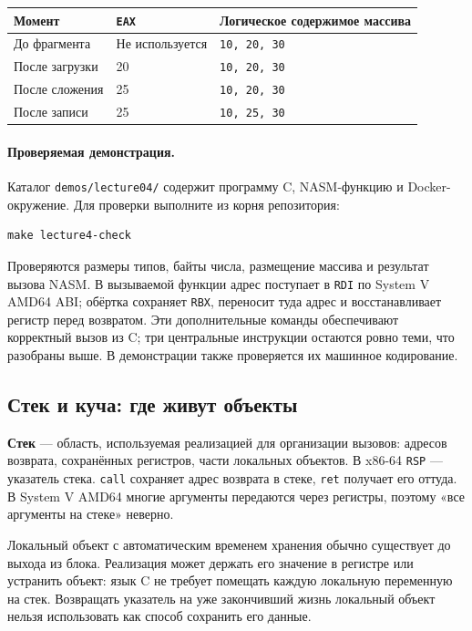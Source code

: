 \begin{center}
\small
\begin{tabular}{|l|l|l|}
\hline
Момент & \texttt{EAX} & Логическое содержимое массива \\
\hline
До фрагмента & Не используется & \texttt{10, 20, 30} \\
После загрузки & 20 & \texttt{10, 20, 30} \\
После сложения & 25 & \texttt{10, 20, 30} \\
После записи & 25 & \texttt{10, 25, 30} \\
\hline
\end{tabular}
\end{center}

\paragraph{Проверяемая демонстрация.}
Каталог \texttt{demos/lecture04/} содержит программу C, NASM-функцию
и Docker-окружение. Для проверки выполните из корня репозитория:
\begin{verbatim}
make lecture4-check
\end{verbatim}
Проверяются размеры типов, байты числа, размещение массива и результат
вызова NASM.
В вызываемой функции адрес поступает в \texttt{RDI} по System V AMD64 ABI;
обёртка сохраняет \texttt{RBX}, переносит туда адрес и восстанавливает регистр
перед возвратом. Эти дополнительные команды обеспечивают корректный вызов
из C; три центральные инструкции остаются ровно теми, что разобраны выше.
В демонстрации также проверяется их машинное кодирование.

\subsection{Стек и куча: где живут объекты}
\textbf{Стек} --- область, используемая реализацией для организации вызовов:
адресов возврата, сохранённых регистров, части локальных объектов.
В x86-64 \texttt{RSP} --- указатель стека. \texttt{call} сохраняет адрес
возврата в стеке, \texttt{ret} получает его оттуда. В System V AMD64 многие
аргументы передаются через регистры, поэтому «все аргументы на стеке» неверно.

Локальный объект с автоматическим временем хранения обычно существует
до выхода из блока. Реализация может держать его значение в регистре
или устранить объект: язык C не требует помещать каждую локальную переменную
на стек. Возвращать указатель на уже закончивший жизнь локальный объект
нельзя использовать как способ сохранить его данные.

